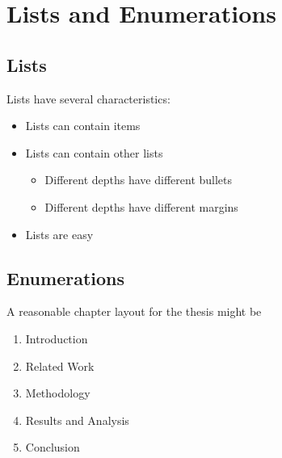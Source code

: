 \chapter{Lists and Enumerations}
\label{chapter:ch5}

\section{Lists}

Lists have several characteristics:

\begin{itemize}
\item Lists can contain items
\item Lists can contain other lists
\begin{itemize}
\item Different depths have different bullets
\item Different depths have different margins
\end{itemize}
\item Lists are easy
\end{itemize}

\section{Enumerations}

A reasonable chapter layout for the thesis might be

\begin{enumerate}
\item Introduction
\item Related Work
\item Methodology
\item Results and Analysis
\item Conclusion
\end{enumerate}

